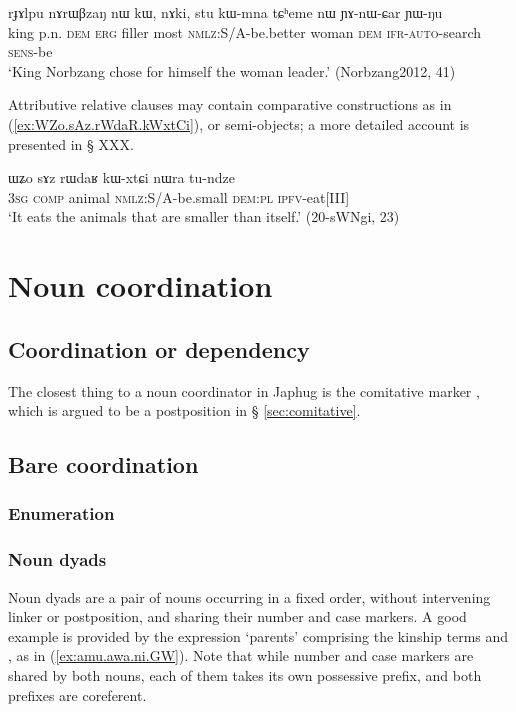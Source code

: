 \begin{exe}
\ex \label{ex:stu.kWmna.tCheme}
\gll  rɟɤlpu nɤrɯβzaŋ nɯ kɯ, nɤki, stu kɯ-mna tɕʰeme nɯ ɲɤ-nɯ-ɕar ɲɯ-ŋu \\
king p.n. \textsc{dem} \textsc{erg} filler most \textsc{nmlz}:S/A-be.better woman \textsc{dem} \textsc{ifr}-\textsc{auto}-search \textsc{sens}-be \\
\glt `King Norbzang chose for himself the woman leader.' (Norbzang2012, 41)
\end{exe} 


Attributive relative clauses may contain comparative constructions as in (\ref{ex:WZo.sAz.rWdaR.kWxtCi}), or semi-objects; a more detailed account is presented in § XXX.

\begin{exe}
\ex \label{ex:WZo.sAz.rWdaR.kWxtCi}
\gll ɯʑo sɤz rɯdaʁ kɯ-xtɕi nɯra tu-ndze \\
\textsc{3sg} \textsc{comp} animal \textsc{nmlz}:S/A-be.small \textsc{dem}:\textsc{pl} \textsc{ipfv}-eat[III] \\
\glt `It eats the animals that are smaller than itself.' (20-sWNgi, 23)
\end{exe}

 \section{Noun coordination}
\subsection{Coordination or dependency} \label{sec:coordinator}
The closest thing to a noun coordinator in Japhug is the comitative marker , which is argued to be a postposition in § \ref{sec:comitative}.


\subsection{Bare coordination}

\subsubsection{Enumeration} \label{sec:noun.enumeration}

\subsubsection{Noun dyads} \label{sec:dyads}
Noun dyads are a pair of nouns occurring in a fixed order, without intervening linker or postposition, and sharing their number and case markers. A good example is provided by the expression `parents' comprising the kinship terms  and , as in (\ref{ex:amu.awa.ni.GW}). Note that while number and case markers are shared by both nouns, each of them takes its own possessive prefix, and both prefixes are coreferent. 

